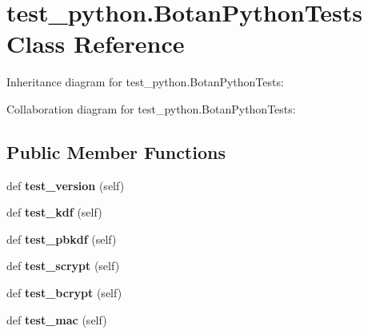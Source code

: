 \hypertarget{classtest__python_1_1_botan_python_tests}{}\section{test\+\_\+python.\+Botan\+Python\+Tests Class Reference}
\label{classtest__python_1_1_botan_python_tests}


Inheritance diagram for test\+\_\+python.\+Botan\+Python\+Tests\+:


Collaboration diagram for test\+\_\+python.\+Botan\+Python\+Tests\+:
\subsection*{Public Member Functions}
\begin{DoxyCompactItemize}
\item 
\mbox{\label{classtest__python_1_1_botan_python_tests_a230477b06a12c7e1c3bad3c0bc7d5eda}} 
def {\bfseries test\+\_\+version} (self)
\item 
\mbox{\label{classtest__python_1_1_botan_python_tests_ab33566e7feffdabb26aeb017313ddf93}} 
def {\bfseries test\+\_\+kdf} (self)
\item 
\mbox{\label{classtest__python_1_1_botan_python_tests_a060d7439beff6b3bec9b406813e96f31}} 
def {\bfseries test\+\_\+pbkdf} (self)
\item 
\mbox{\label{classtest__python_1_1_botan_python_tests_abe3c42c920213e5e011a503ab9adcd90}} 
def {\bfseries test\+\_\+scrypt} (self)
\item 
\mbox{\label{classtest__python_1_1_botan_python_tests_ad1e84a1ff44ddb2ee87594a5e7d56cd4}} 
def {\bfseries test\+\_\+bcrypt} (self)
\item 
\mbox{\label{classtest__python_1_1_botan_python_tests_a27214c9877cfd3afedf378cca99fa71c}} 
def {\bfseries test\+\_\+mac} (self)
\item 
\mbox{\label{classtest__python_1_1_botan_python_tests_a66d5c996326236bcd0e033198609e215}} 

\end{DoxyCompactItemize}
